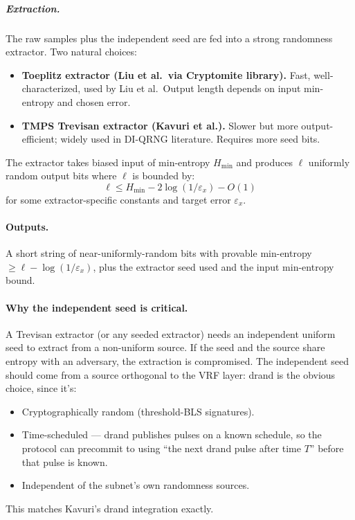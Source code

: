 \documentclass[11pt]{article}
\begin{document}
\subparagraph{Extraction.} The raw samples plus the independent seed are fed into a strong randomness extractor. Two natural choices:

\begin{itemize}
    \item \textbf{Toeplitz extractor (Liu et al.\ via Cryptomite library).} Fast, well-characterized, used by Liu et al.\ Output length depends on input min-entropy and chosen error.
    \item \textbf{TMPS Trevisan extractor (Kavuri et al.).} Slower but more output-efficient; widely used in DI-QRNG literature. Requires more seed bits.
\end{itemize}

The extractor takes biased input of min-entropy $H_{\min}$ and produces $\ell$ uniformly random output bits where $\ell$ is bounded by:
\[
\ell \leq H_{\min} - 2 \log(1/\varepsilon_x) - O(1)
\]
for some extractor-specific constants and target error $\varepsilon_x$.

\paragraph{Outputs.} A short string of near-uniformly-random bits with provable min-entropy $\geq \ell - \log(1/\varepsilon_x)$, plus the extractor seed used and the input min-entropy bound.

\paragraph{Why the independent seed is critical.} A Trevisan extractor (or any seeded extractor) needs an independent uniform seed to extract from a non-uniform source. If the seed and the source share entropy with an adversary, the extraction is compromised. The independent seed should come from a source orthogonal to the VRF layer: drand is the obvious choice, since it's:
\begin{itemize}
    \item Cryptographically random (threshold-BLS signatures).
    \item Time-scheduled --- drand publishes pulses on a known schedule, so the protocol can precommit to using ``the next drand pulse after time $T$'' before that pulse is known.
    \item Independent of the subnet's own randomness sources.
\end{itemize}
This matches Kavuri's drand integration exactly.
\end{document}
